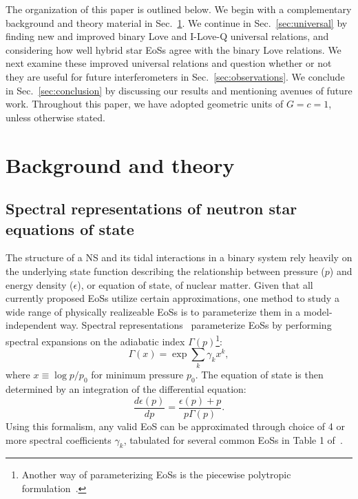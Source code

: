 \documentclass[prd,twocolumn,nofootinbib,superscriptaddress,amsmath,amssymb]{revtex4-1}
\begin{document}
The organization of this paper is outlined below.
We begin with a complementary background and theory material in Sec.~\ref{sec:theory}.
We continue in Sec.~\ref{sec:universal} by finding new and improved binary Love and I-Love-Q universal relations, and considering how well hybrid star EoSs agree with the binary Love relations.
We next examine these improved universal relations and question whether or not they are useful for future interferometers in Sec.~\ref{sec:observations}.
We conclude in Sec.~\ref{sec:conclusion} by discussing our results and mentioning avenues of future work.
Throughout this paper, we have adopted geometric units of $G=c=1$, unless otherwise stated.

\section{Background and theory}\label{sec:theory}

\subsection{Spectral representations of neutron star equations of state}\label{sec:eos}
The structure of a NS and its tidal interactions in a binary system rely heavily on the underlying state function describing the relationship between pressure ($p$) and energy density ($\epsilon$), or equation of state, of nuclear matter.
Given that all currently proposed EoSs utilize certain approximations, one method to study a wide range of physically realizeable EoSs is to parameterize them in a model-independent way.
Spectral representations~\cite{Lindblom:2010bb,Lindblom:2012zi,Lindblom:2013kra,Lindblom:2018rfr,Abbott:2018exr} parameterize EoSs by performing spectral expansions on the adiabatic index $\Gamma(p)$\footnote{Another way of parameterizing EoSs is the piecewise polytropic formulation~\cite{Read2009,Lackey:2014fwa,Carney:2018sdv}.}:
\begin{equation}
\Gamma(x) = \exp{\sum_k\gamma_k x^k},
\end{equation}
where $x \equiv \log{p/p_0}$ for minimum pressure $p_0$.
The equation of state is then determined by an integration of the differential equation:
\begin{equation}
\frac{d \epsilon(p)}{dp}=\frac{\epsilon(p)+p}{p \Gamma(p)}.
\end{equation}
Using this formalism, any valid EoS can be approximated through choice of 4 or more spectral coefficients $\gamma_k$, tabulated for several common EoSs in Table 1 of~\cite{Lindblom:2018rfr}.
\end{document}
